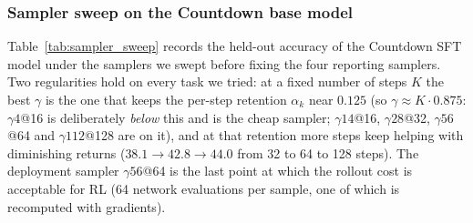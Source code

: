 \subsubsection{Sampler sweep on the Countdown base model}
\label{app:sampler_sweep}
Table~\ref{tab:sampler_sweep} records the held-out accuracy of the Countdown SFT model under the samplers we swept before fixing the four reporting samplers. Two regularities hold on every task we tried: at a fixed number of steps $K$ the best $\gamma$ is the one that keeps the per-step retention $\alpha_k$ near $0.125$ (so $\gamma\approx K\cdot0.875$: $\gamma4$@16 is deliberately \emph{below} this and is the cheap sampler; $\gamma14$@16, $\gamma28$@32, $\gamma56$@64 and $\gamma112$@128 are on it), and at that retention more steps keep helping with diminishing returns ($38.1\to42.8\to44.0$ from 32 to 64 to 128 steps). The deployment sampler $\gamma56$@64 is the last point at which the rollout cost is acceptable for RL (64 network evaluations per sample, one of which is recomputed with gradients).

\begin{table}[H]\centering\small
\caption{Countdown held-out accuracy of the SFT model under different samplers (classifier-free guidance 2 unless stated). Left: the base checkpoint used in the paper (epoch 60). Right: an earlier checkpoint (epoch 42) on which the wider grid was run, evaluated on the full held-out set.}\label{tab:sampler_sweep}
\end{table}


\fi
